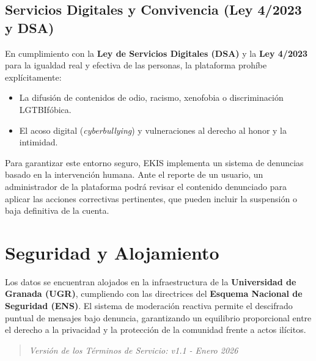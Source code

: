 \subsection{Servicios Digitales y Convivencia (Ley 4/2023 y DSA)}
En cumplimiento con la \textbf{Ley de Servicios Digitales (DSA)} y la \textbf{Ley 4/2023} para la igualdad real y efectiva de las personas, la plataforma prohíbe explícitamente:
\begin{itemize}
    \item La difusión de contenidos de odio, racismo, xenofobia o discriminación LGTBIfóbica.
    \item El acoso digital (\textit{cyberbullying}) y vulneraciones al derecho al honor y la intimidad.
\end{itemize}
Para garantizar este entorno seguro, EKIS implementa un sistema de denuncias basado en la intervención humana. Ante el reporte de un usuario, un administrador de la plataforma podrá revisar el contenido denunciado para aplicar las acciones correctivas pertinentes, que pueden incluir la suspensión o baja definitiva de la cuenta.

\section{Seguridad y Alojamiento}
Los datos se encuentran alojados en la infraestructura de la \textbf{Universidad de Granada (UGR)}, cumpliendo con las directrices del \textbf{Esquema Nacional de Seguridad (ENS)}. El sistema de moderación reactiva permite el descifrado puntual de mensajes bajo denuncia, garantizando un equilibrio proporcional entre el derecho a la privacidad y la protección de la comunidad frente a actos ilícitos.

\vspace{1cm}
\begin{quote}
    \textit{Versión de los Términos de Servicio: v1.1 - Enero 2026}
\end{quote}